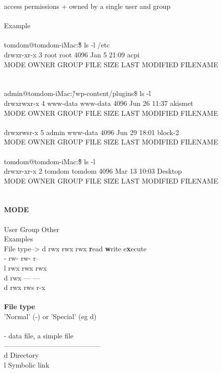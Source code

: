 \documentclass[10pt,a4paper]{article}
\begin{document}
{{{{{{{{{{{{{{{{{{{{access permissions + owned by a single user and group\\
\\
Example\\
\\
tomdom@tomdom-iMac:\~\$ ls -l /etc\\
drwxr-xr-x  	3 	root			root   		4096 		Jan  	5	21:09 	acpi\\
MODE			OWNER		GROUP		FILE SIZE		LAST MODIFIED	FILENAME\\
\\
\\
admin@tomdom-iMac:\~/wp-content/plugins\$ ls -l\\
drwxrwxr-x	4 	www-data	www-data 	4096 		Jun 26 	11:37 	akismet\\
MODE			OWNER		GROUP		FILE SIZE		LAST MODIFIED	FILENAME\\
\\
drwxrwsr-x	5 	admin 		www-data 	4096 		Jun 29 	18:01 	block-2\\
MODE			OWNER		GROUP		FILE SIZE		LAST MODIFIED	FILENAME\\
\\
tomdom@tomdom-iMac:\~\$ ls -l\\
drwxr-xr-x  	2 	tomdom 		tomdom    	4096 		Mar 13 10:03 		Desktop\\
MODE			OWNER		GROUP		FILE SIZE		LAST MODIFIED	FILENAME\\
\\
\\
    			\textbf{MODE}}{\large \\
\\
    		 		User 	Group	Other\\
Examples\\
File type-->	d	rwx		rwx		rwx			\textbf{r}}{\large ead \textbf{w}}{\large rite e\textbf{x}}{\large ecute\\
			-	rw-		rw-		r--\\
			l	rwx		rwx		rwx\\
			d	rwx		---		---\\
			d	rwx		rws		r-x\\
\\
\textbf{File type}}{\large \\
'Normal' (-) or 'Special' (eg d)\\
\\
-	data file, a simple file\\
------------------------------------------\\
d	Directory\\
l	Symbolic link\\
}}}}}}}}}}}}}}}}}}}}
\end{document}
